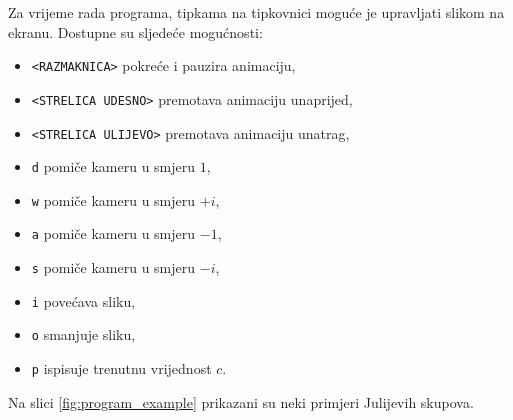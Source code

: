 \documentclass[a4paper]{article}
\begin{document}
Za vrijeme rada programa, tipkama na tipkovnici moguće je upravljati slikom na 
ekranu. Dostupne su sljedeće mogućnosti:
\begin{itemize}
    \item \texttt{<RAZMAKNICA>} pokreće i pauzira animaciju,
    \item \texttt{<STRELICA UDESNO>} premotava animaciju unaprijed,
    \item \texttt{<STRELICA ULIJEVO>} premotava animaciju unatrag,
    \item \texttt{d} pomiče kameru u smjeru $1$,
    \item \texttt{w} pomiče kameru u smjeru $+i$,
    \item \texttt{a} pomiče kameru u smjeru $-1$,
    \item \texttt{s} pomiče kameru u smjeru $-i$,
    \item \texttt{i} povećava sliku,
    \item \texttt{o} smanjuje sliku,
    \item \texttt{p} ispisuje trenutnu vrijednost $c$.
\end{itemize}

Na slici \ref{fig:program_example} prikazani su neki primjeri Julijevih skupova.
\end{document}
